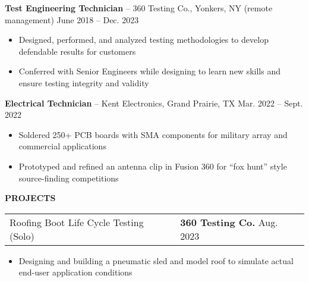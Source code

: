 \documentclass[18pt]{article}
\begin{document}
\vspace{-0.5\baselineskip}
\textbf{Test Engineering Technician} – 360 Testing Co., Yonkers, NY (remote management) \hfill June 2018 – Dec. 2023

\begin{itemize}[noitemsep]
    \vspace{-0.75\baselineskip}
    \item Designed, performed, and analyzed testing methodologies to develop defendable results for customers
    \item Conferred with Senior Engineers while designing to learn new skills and ensure testing integrity and validity
\end{itemize}

\vspace{-0.5\baselineskip}
\textbf{Electrical Technician} – Kent Electronics, Grand Prairie, TX \hfill Mar. 2022 – Sept. 2022

\begin{itemize}[noitemsep]
    \vspace{-0.75\baselineskip}
    \item Soldered 250+ PCB boards with SMA components for military array and commercial applications
    \item Prototyped and refined an antenna clip in Fusion 360 for “fox hunt” style source-finding competitions 
\end{itemize}



\vspace{-1.25\baselineskip}
\begin{center}
    \textbf{PROJECTS}
    \hrulefill
\end{center}
\vspace{-0.5\baselineskip}


\begin{tabular}{p{} p{} }
    Roofing Boot Life Cycle Testing (Solo)
    &
    \textbf{360 Testing Co.}
    \hfill Aug. 2023
\end{tabular}

\vspace{-0.5\baselineskip}
\begin{itemize}[noitemsep]
    \item Designing and building a pneumatic sled and model roof to simulate actual end-user application conditions 
\end{itemize}
\end{document}

